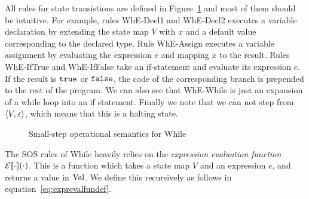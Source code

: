 All rules for state transistions are defined in Figure~\ref{fig:while_sos} and
most of them should be intuitive. For example, rules {\sc WhE-Decl1} and {\sc
WhE-Decl2} executes a variable declaration by extending the state map $V$ with
$x$ and a default value corresponding to the declared type. Rule {\sc
WhE-Assign} executes a variable assignment by evaluating the expression $e$ and
mapping $x$ to the result. Rules {\sc
WhE-IfTrue} and {\sc WhE-IfFalse} take an if-statement and evaluate its
expression $e$. If the result is $\mbox{\texttt{true}}$ or $\mbox{\texttt{false}}$, the code of the
corresponding branch is prepended to the rest of the program. We can also see
that {\sc WhE-While} is just an expansion of a while loop into an if statement.
Finally we note that we can not step from $\langle V, \varepsilon \rangle$, which means
that this is a halting state.

\begin{figure}[]
  \centering
  
  \RuleSpace

  
  \RuleSpace


  \RuleSpace


  \RuleSpace

  { \: \rightarrow \: }

  \RuleSpace 

  { \: \rightarrow \: }
  
  \RuleSpace


  \caption{Small-step operational semantics for While}
  \label{fig:while_sos}
\end{figure}

The SOS rules of While heavily relies on the \emph{expression evaluation
function} $\mathcal{E}\llbracket \cdot \rrbracket(\cdot)$. This is a function which takes a state map
$V$ and an expression $e$, and returns a value in $\mbox{$\mathrm{Val}$}$. We define this
recursively as follows in equation~\eqref{eq:exprevalfundef}.

